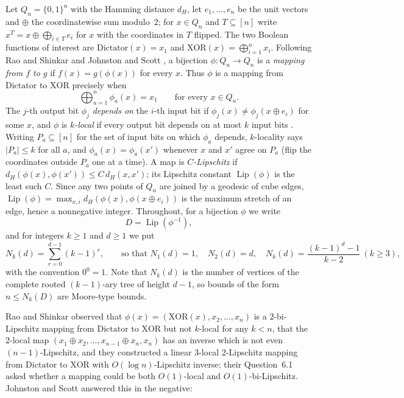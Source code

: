 \documentclass[11pt,a4paper]{article}
\theoremstyle{plain}
\theoremstyle{definition}
\theoremstyle{remark}
\newcommand{\dH}{d_H}
\newcommand{\Lip}{\operatorname{Lip}}
\newcommand{\Dict}{\mathrm{Dictator}}
\newcommand{\XOR}{\mathrm{XOR}}
\begin{document}
Let $Q_n=\{0,1\}^n$ with the Hamming distance $\dH$, let $e_1,\dots,e_n$ be the unit vectors and $\oplus$ the coordinatewise sum modulo~$2$; for $x\in Q_n$ and $T\subseteq[n]$ write $x^T=x\oplus\bigoplus_{i\in T}e_i$ for $x$ with the coordinates in $T$ flipped. The two Boolean functions of interest are $\Dict(x)=x_1$ and $\XOR(x)=\bigoplus_{i=1}^n x_i$. Following Rao and Shinkar \cite{RS18} and Johnston and Scott \cite{JS21}, a bijection $\phi\colon Q_n\to Q_n$ is a \emph{mapping from $f$ to $g$} if $f(x)=g(\phi(x))$ for every $x$. Thus $\phi$ is a mapping from $\Dict$ to $\XOR$ precisely when
\begin{equation}\label{eq:dx}
\bigoplus_{a=1}^n\phi_a(x)=x_1\qquad\text{for every }x\in Q_n .
\end{equation}
The $j$-th output bit $\phi_j$ \emph{depends on} the $i$-th input bit if $\phi_j(x)\ne\phi_j(x\oplus e_i)$ for some $x$, and $\phi$ is \emph{$k$-local} if every output bit depends on at most $k$ input bits \cite{JS21}. Writing $P_a\subseteq[n]$ for the set of input bits on which $\phi_a$ depends, $k$-locality says $|P_a|\le k$ for all $a$, and $\phi_a(x)=\phi_a(x')$ whenever $x$ and $x'$ agree on $P_a$ (flip the coordinates outside $P_a$ one at a time). A map is \emph{$C$-Lipschitz} if $\dH(\phi(x),\phi(x'))\le C\,\dH(x,x')$; its Lipschitz constant $\Lip(\phi)$ is the least such $C$. Since any two points of $Q_n$ are joined by a geodesic of cube edges, $\Lip(\phi)=\max_{x,i}\dH(\phi(x),\phi(x\oplus e_i))$ is the maximum stretch of an edge, hence a nonnegative integer. Throughout, for a bijection $\phi$ we write
\[
D=\Lip(\phi^{-1}),
\]
and for integers $k\ge1$ and $d\ge1$ we put
\begin{equation}\label{eq:N}
N_k(d)=\sum_{r=0}^{d-1}(k-1)^r ,\qquad\text{so that }N_1(d)=1,\quad N_2(d)=d,\quad N_k(d)=\frac{(k-1)^d-1}{k-2}\ (k\ge3),
\end{equation}
with the convention $0^0=1$. Note that $N_k(d)$ is the number of vertices of the complete rooted $(k-1)$-ary tree of height $d-1$, so bounds of the form $n\le N_k(D)$ are Moore-type bounds.

Rao and Shinkar \cite{RS18} observed that $\phi(x)=(\XOR(x),x_2,\dots,x_n)$ is a $2$-bi-Lipschitz mapping from $\Dict$ to $\XOR$ but not $k$-local for any $k<n$, that the $2$-local map $(x_1\oplus x_2,\dots,x_{n-1}\oplus x_n,x_n)$ has an inverse which is not even $(n-1)$-Lipschitz, and they constructed a linear $3$-local $2$-Lipschitz mapping from $\Dict$ to $\XOR$ with $O(\log n)$-Lipschitz inverse; their Question~6.1 asked whether a mapping could be both $O(1)$-local and $O(1)$-bi-Lipschitz. Johnston and Scott answered this in the negative:
\end{document}
